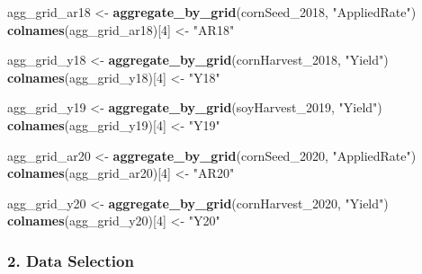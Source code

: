 \documentclass[
]{article}
\newenvironment{Shaded}{\begin{snugshade}}{\end{snugshade}}
\newcommand{\DecValTok}[1]{\textcolor[rgb]{0.00,0.00,0.81}{#1}}
\newcommand{\FunctionTok}[1]{\textcolor[rgb]{0.13,0.29,0.53}{\textbf{#1}}}
\newcommand{\NormalTok}[1]{#1}
\newcommand{\OtherTok}[1]{\textcolor[rgb]{0.56,0.35,0.01}{#1}}
\newcommand{\StringTok}[1]{\textcolor[rgb]{0.31,0.60,0.02}{#1}}
\begin{document}
\begin{Shaded}
\begin{Highlighting}[]
\NormalTok{agg\_grid\_ar18 }\OtherTok{\textless{}{-}} \FunctionTok{aggregate\_by\_grid}\NormalTok{(cornSeed\_2018, }\StringTok{"AppliedRate"}\NormalTok{)}
\FunctionTok{colnames}\NormalTok{(agg\_grid\_ar18)[}\DecValTok{4}\NormalTok{] }\OtherTok{\textless{}{-}} \StringTok{"AR18"}

\NormalTok{agg\_grid\_y18  }\OtherTok{\textless{}{-}} \FunctionTok{aggregate\_by\_grid}\NormalTok{(cornHarvest\_2018,  }\StringTok{"Yield"}\NormalTok{)}
\FunctionTok{colnames}\NormalTok{(agg\_grid\_y18)[}\DecValTok{4}\NormalTok{] }\OtherTok{\textless{}{-}} \StringTok{"Y18"}

\NormalTok{agg\_grid\_y19  }\OtherTok{\textless{}{-}} \FunctionTok{aggregate\_by\_grid}\NormalTok{(soyHarvest\_2019,   }\StringTok{"Yield"}\NormalTok{)}
\FunctionTok{colnames}\NormalTok{(agg\_grid\_y19)[}\DecValTok{4}\NormalTok{] }\OtherTok{\textless{}{-}} \StringTok{"Y19"}

\NormalTok{agg\_grid\_ar20 }\OtherTok{\textless{}{-}} \FunctionTok{aggregate\_by\_grid}\NormalTok{(cornSeed\_2020,     }\StringTok{"AppliedRate"}\NormalTok{)}
\FunctionTok{colnames}\NormalTok{(agg\_grid\_ar20)[}\DecValTok{4}\NormalTok{] }\OtherTok{\textless{}{-}} \StringTok{"AR20"}

\NormalTok{agg\_grid\_y20  }\OtherTok{\textless{}{-}} \FunctionTok{aggregate\_by\_grid}\NormalTok{(cornHarvest\_2020,  }\StringTok{"Yield"}\NormalTok{)}
\FunctionTok{colnames}\NormalTok{(agg\_grid\_y20)[}\DecValTok{4}\NormalTok{] }\OtherTok{\textless{}{-}} \StringTok{"Y20"}
\end{Highlighting}
\end{Shaded}

\subsubsection{2. Data Selection}\label{data-selection}
\end{document}
